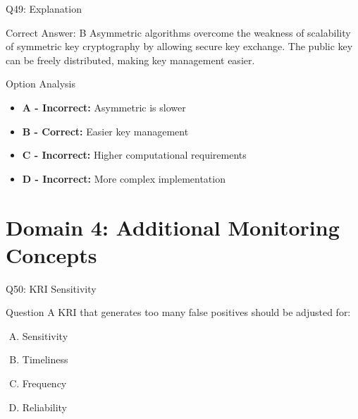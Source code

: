 \documentclass{beamer}
\begin{document}
	\begin{frame}{Q49: Explanation}
		\begin{block}{Correct Answer: B}
			Asymmetric algorithms overcome the weakness of scalability of symmetric key cryptography by allowing secure key exchange. The public key can be freely distributed, making key management easier.
		\end{block}
		\begin{block}{Option Analysis}
			\begin{itemize}
				\item \textbf{A - Incorrect:} Asymmetric is slower
				\item \textbf{B - Correct:} Easier key management
				\item \textbf{C - Incorrect:} Higher computational requirements
				\item \textbf{D - Incorrect:} More complex implementation
			\end{itemize}
		\end{block}
	\end{frame}
	
	
	\section{Domain 4: Additional Monitoring Concepts}
	
	\begin{frame}{Q50: KRI Sensitivity}
		\begin{block}{Question}
			A KRI that generates too many false positives should be adjusted for:
		\end{block}
		\begin{enumerate}[(A)]
			\item Sensitivity
			\item Timeliness
			\item Frequency
			\item Reliability
		\end{enumerate}
	\end{frame}
	
\end{document}
